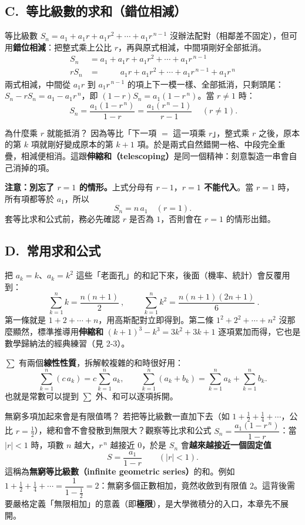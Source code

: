 \documentclass[11pt]{article}
\begin{document}
\subsection*{\sffamily C.\ 等比級數的求和（錯位相減）}

等比級數 $S_n=a_1+a_1r+a_1r^2+\cdots+a_1r^{\,n-1}$ 沒辦法配對（相鄰差不固定），但可用\textbf{錯位相減}：把整式乘上公比 $r$，再與原式相減，中間項剛好全部抵消。
$$
\begin{aligned}
S_n &= a_1 + a_1r + a_1r^2 + \cdots + a_1r^{\,n-1}\\
rS_n &= \qquad\ \ a_1r + a_1r^2 + \cdots + a_1r^{\,n-1} + a_1r^{\,n}
\end{aligned}
$$
兩式相減，中間從 $a_1r$ 到 $a_1r^{\,n-1}$ 的項上下一模一樣、全部抵消，只剩頭尾：$S_n-rS_n=a_1-a_1r^{\,n}$，即 $(1-r)S_n=a_1(1-r^{\,n})$。當 $r\neq1$ 時：
$$
\boxed{\,S_n=\frac{a_1(1-r^{\,n})}{1-r}=\frac{a_1(r^{\,n}-1)}{r-1}\,}\quad(r\neq1).
$$

\begin{補充框}{為什麼乘 $r$ 就能抵消？}
因為等比「下一項 $=$ 這一項乘 $r$」，整式乘 $r$ 之後，原本的第 $k$ 項就剛好變成原本的第 $k+1$ 項。於是兩式自然錯開一格、中段完全重疊，相減便相消。這跟\textbf{伸縮和（telescoping）}是同一個精神：刻意製造一串會自己消掉的項。
\end{補充框}

\textbf{注意：別忘了 $r=1$ 的情形。}上式分母有 $r-1$，\textbf{$r=1$ 不能代入}。當 $r=1$ 時，所有項都等於 $a_1$，所以
$$S_n=n\,a_1\quad(r=1).$$
套等比求和公式前，務必先確認 $r$ 是否為 $1$，否則會在 $r=1$ 的情形出錯。

\subsection*{\sffamily D.\ 常用求和公式}

把 $a_k=k$、$a_k=k^2$ 這些「老面孔」的和記下來，後面（機率、統計）會反覆用到：
$$
\boxed{\ \sum_{k=1}^{n}k=\frac{n(n+1)}{2}\ },\qquad
\boxed{\ \sum_{k=1}^{n}k^2=\frac{n(n+1)(2n+1)}{6}\ }.
$$
第一條就是 $1+2+\cdots+n$，用高斯配對立即得到。第二條 $1^2+2^2+\cdots+n^2$ 沒那麼顯然，標準推導用\textbf{伸縮和} $(k+1)^3-k^3=3k^2+3k+1$ 逐項累加而得，它也是數學歸納法的經典練習（見 2-3）。

$\sum$ 有兩個\textbf{線性性質}，拆解較複雜的和時很好用：
$$
\sum_{k=1}^{n}(c\,a_k)=c\sum_{k=1}^{n}a_k,\qquad
\sum_{k=1}^{n}(a_k+b_k)=\sum_{k=1}^{n}a_k+\sum_{k=1}^{n}b_k .
$$
也就是常數可以提到 $\sum$ 外、和可以逐項拆開。

\begin{延伸框}{無窮多項加起來會是有限值嗎？}
若把等比級數一直加下去（如 $1+\tfrac12+\tfrac14+\cdots$，公比 $r=\tfrac12$），總和會不會發散到無限大？觀察等比求和公式 $S_n=\dfrac{a_1(1-r^{\,n})}{1-r}$：當 $|r|<1$ 時，項數 $n$ 越大，$r^{\,n}$ 越接近 $0$，於是 $S_n$ 會\textbf{越來越接近一個固定值}
$$
S=\frac{a_1}{1-r}\qquad(|r|<1).
$$
這稱為\textbf{無窮等比級數（infinite geometric series）}的和。例如 $1+\tfrac12+\tfrac14+\cdots=\dfrac{1}{1-\frac12}=2$：無窮多個正數相加，竟然收斂到有限值 $2$。這背後需要嚴格定義「無限相加」的意義（即\textbf{極限}），是大學微積分的入口，本章先不展開。
\end{延伸框}
\end{document}
